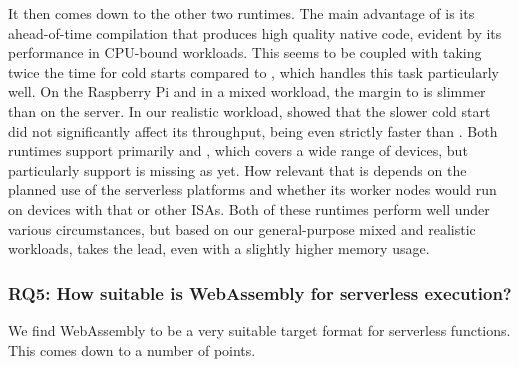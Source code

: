 It then comes down to the other two runtimes. The main advantage of  is its ahead-of-time compilation that produces high quality native code, evident by its performance in CPU-bound workloads. This seems to be coupled with taking twice the time for cold starts compared to , which handles this task particularly well. On the Raspberry Pi and in a mixed workload, the margin to  is slimmer than on the server.
In our realistic workload,  showed that the slower cold start did not significantly affect its throughput, being even strictly faster than .
Both runtimes support primarily  and , which covers a wide range of devices, but particularly  support is missing as yet. How relevant that is depends on the planned use of the serverless platforms and whether its worker nodes would run on devices with that or other ISAs.
Both of these runtimes perform well under various circumstances, but based on our general-purpose mixed and realistic workloads,  takes the lead, even with a slightly higher memory usage.



\subsubsection*{RQ5: How suitable is WebAssembly for serverless execution?}

We find WebAssembly to be a very suitable target format for serverless functions. This comes down to a number of points.

